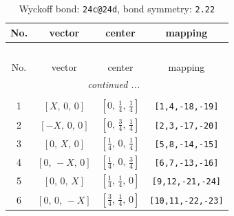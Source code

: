 \documentclass[fleqn,8pt]{jsarticle}
\begin{document}
\begin{longtable}{cccc}
\caption{Wyckoff bond: {\tt 24c@24d}, bond symmetry: {\tt 2.22}}
 \\
 \hline \hline
No. & vector & center & mapping \\ \hline \endfirsthead

\multicolumn{3}{l}{\tablename\ \thetable{}} \\
 \hline \hline
No. & vector & center & mapping \\ \hline \endhead

 \hline \hline
\multicolumn{3}{r}{\footnotesize\it continued ...} \\ \endfoot

 \hline \hline
\multicolumn{3}{r}{} \\ \endlastfoot

1 & $\left[ X,\, 0,\, 0 \right]$ & $\left[ 0,\, \frac{1}{4},\, \frac{1}{4} \right]$ & {\tt [1,4,-18,-19]} \\ \hline
2 & $\left[ - X,\, 0,\, 0 \right]$ & $\left[ 0,\, \frac{3}{4},\, \frac{1}{4} \right]$ & {\tt [2,3,-17,-20]} \\ \hline
3 & $\left[ 0,\, X,\, 0 \right]$ & $\left[ \frac{1}{4},\, 0,\, \frac{1}{4} \right]$ & {\tt [5,8,-14,-15]} \\ \hline
4 & $\left[ 0,\, - X,\, 0 \right]$ & $\left[ \frac{1}{4},\, 0,\, \frac{3}{4} \right]$ & {\tt [6,7,-13,-16]} \\ \hline
5 & $\left[ 0,\, 0,\, X \right]$ & $\left[ \frac{1}{4},\, \frac{1}{4},\, 0 \right]$ & {\tt [9,12,-21,-24]} \\ \hline
6 & $\left[ 0,\, 0,\, - X \right]$ & $\left[ \frac{3}{4},\, \frac{1}{4},\, 0 \right]$ & {\tt [10,11,-22,-23]} \\
\end{longtable}
\renewcommand{\arraystretch}{1.2}
\end{document}
